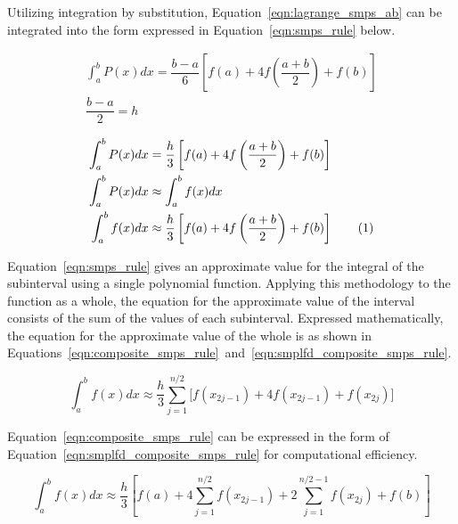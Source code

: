 \documentclass{paper}
\newcommand*\tageq{\refstepcounter{equation}\tag{\theequation}}
\begin{document}
\noindent
Utilizing integration by substitution, Equation~\ref{eqn:lagrange_smps_ab} can be integrated into the form expressed in Equation~\ref{eqn:smps_rule} below.

\begin{gather*}
\int_a^b P(x) dx = \dfrac{b - a}{6} \left[f(a) + 4f\left(\dfrac{a + b}{2}\right) + f(b)\right]                          \\
\dfrac{b - a}{2} = h                                                                                                    \\
\end{gather*}
\begin{align*}
    \int_a^b P(x) dx &= \dfrac{h}{3} \left[f(a) + 4f\left(\dfrac{a + b}{2}\right) + f(b)\right]                         \\
    \int_a^b P(x) dx &\approx \int_a^b f(x) dx                                                                          \\
    \int_a^b f(x) dx &\approx \dfrac{h}{3} \left[f(a) + 4f\left(\dfrac{a + b}{2}\right) + f(b)\right]  \tageq\label{eqn:smps_rule}
\end{align*}


\noindent
Equation~\ref{eqn:smps_rule} gives an approximate value for the integral of the subinterval using a single polynomial function.
Applying this methodology to the function as a whole, the equation for the approximate value of the interval consists of the sum of the values of each subinterval.
Expressed mathematically, the equation for the approximate value of the whole is as shown in Equations~\ref{eqn:composite_smps_rule}~and~\ref{eqn:smplfd_composite_smps_rule}.

\begin{equation}
    \label{eqn:composite_smps_rule}
    \int_a^b f(x) dx \approx \dfrac{h}{3} \sum_{j=1}^{n / 2} \biggl[f(x_{2j-1}) + 4f(x_{2j-1}) + f(x_{2j})\biggr]
\end{equation}

\noindent
Equation~\ref{eqn:composite_smps_rule} can be expressed in the form of Equation~\ref{eqn:smplfd_composite_smps_rule} for computational efficiency.

\begin{equation}
    \label{eqn:smplfd_composite_smps_rule}
    \int_a^b f(x) dx \approx \dfrac{h}{3} \left[f(a) + 4 \sum_{j=1}^{n / 2} f(x_{2j-1}) + 2  \sum_{j=1}^{n / 2 - 1} f(x_{2j}) + f(b)\right]
\end{equation}
\end{document}
